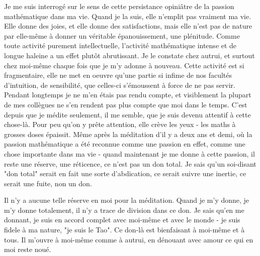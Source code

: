 Je me suis interrogé sur le sens de cette persistance opiniâtre de la passion mathématique dans ma vie. Quand je la suis, elle n'emplit pas vraiment ma vie. Elle donne des joies, et elle donne des satisfactions, mais elle n'est pas de nature par elle-même à donner un véritable épanouissement, une plénitude. Comme toute activité purement intellectuelle, l'activité mathématique intense et de longue haleine a un effet plutôt abrutissant. Je le constate chez autrui, et surtout chez moi-même chaque fois que je m’y adonne à nouveau. Cette activité est si fragmentaire, elle ne met en oeuvre qu'une partie si infime de nos facultés d'intuition, de sensibilité, que celles-ci s'émoussent à force de ne pas servir. Pendant longtemps je ne m'en étais pas rendu compte, et visiblement la plupart de mes collègues ne s'en rendent pas plus compte que moi dans le temps. C'est depuis que je médite seulement, il me semble, que je suis devenu attentif à cette chose-là. Pour peu qu'on y prête attention, elle crève les yeux - les maths à grosses doses épaissit. Même après la méditation d'il y a deux ans et demi, où la passion mathématique a été reconnue comme une passion en effet, comme une chose importante dans ma vie - quand maintenant je me donne à cette passion, il reste une réserve, une réticence, ce n'est pas un don total. Je sais qu'un soi-disant "don total" serait en fait une sorte d'abdication, ce serait suivre une inertie, ce serait une fuite, non un don.

Il n'y a aucune telle réserve en moi pour la méditation. Quand je m'y donne, je m'y donne totalement, il n'y a trace de division dans ce don. Je sais qu'en me donnant, je suis en accord complet avec moi-même et avec le monde - je suis fidele à ma nature, "je suis le Tao". Ce don-là est bienfaisant à moi-même et à tous. Il m'ouvre à moi-même comme à autrui, en dénouant avec amour ce qui en moi reste noué.

